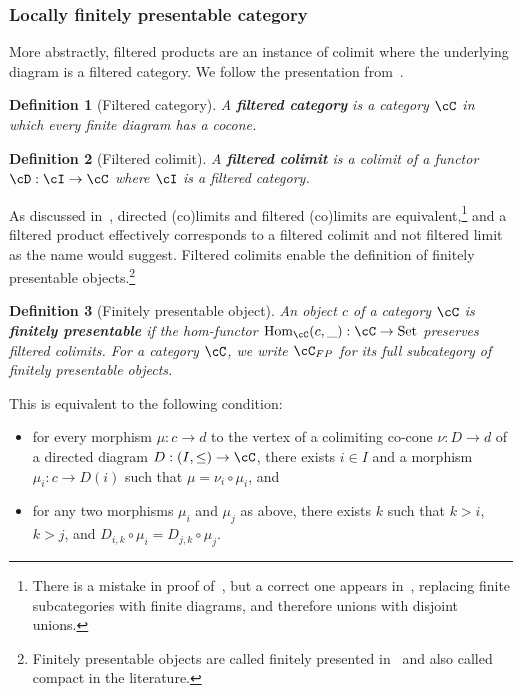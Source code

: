 \documentclass[preprint,3p,times]{elsarticle}
\newtheorem{definition}{Definition}[section]
\newcommand{\Set}{\mathrm{Set}}
\newcommand{\Hom}{\mathrm{Hom}}
\begin{document}
\subsubsection{Locally finitely presentable category}
\label{sec:lfp}

More abstractly, filtered products are an instance of colimit where the underlying diagram is a filtered category. We follow the presentation from~\cite{adamek_locally_1994}.

\begin{definition}[Filtered category]
    A {\bf filtered category} is a category \(\cC\) in which every finite diagram has a cocone.
\end{definition}

\begin{definition}[Filtered colimit]
    A {\bf filtered colimit} is a colimit of a functor \(\cD : \cI \to \cC\) where \(\cI\) is a filtered category.
\end{definition}

As discussed in~\cite{adamek_locally_1994}, directed (co)limits and filtered (co)limits are equivalent,\footnote{There is a mistake in proof of~\cite{adamek_locally_1994}, but a correct one appears in~\cite{andreka_direct_1982}, replacing finite subcategories with finite diagrams, and therefore unions with disjoint unions.} and a filtered product effectively corresponds to a filtered colimit and not filtered limit as the name would suggest. Filtered colimits enable the definition of finitely presentable objects.\footnote{Finitely presentable objects are called finitely presented in~\cite{Dia08} and also called compact in the literature.}

\begin{definition}[Finitely presentable object]
	\label{def:fp object}
    An object \(c\) of a category \(\cC\) is {\bf finitely presentable} if the hom-functor \(\Hom_\cC(c, \_) : \cC \to \Set\) preserves filtered colimits. For a category \(\cC\), we write \(\cC_{FP}\) for its full subcategory of finitely presentable objects. 
\end{definition}

This is equivalent to the following condition:
\begin{itemize}
    \item for every morphism $\mu : c \to d$ to the vertex of a colimiting co-cone $\nu : D \to d$ of a directed diagram $D : (I,\leq) \to \cC$, there exists $i \in I$ and a morphism $\mu_i : c \to D(i)$ such that $\mu = \nu_i \circ \mu_i$, and
    \item for any two morphisms $\mu_i$ and $\mu_j$ as above, there exists $k$ such that $k > i$, $k > j$, and $D_{i,k} \circ \mu_i = D_{j,k} \circ \mu_j$.
\end{itemize}
\end{document}

